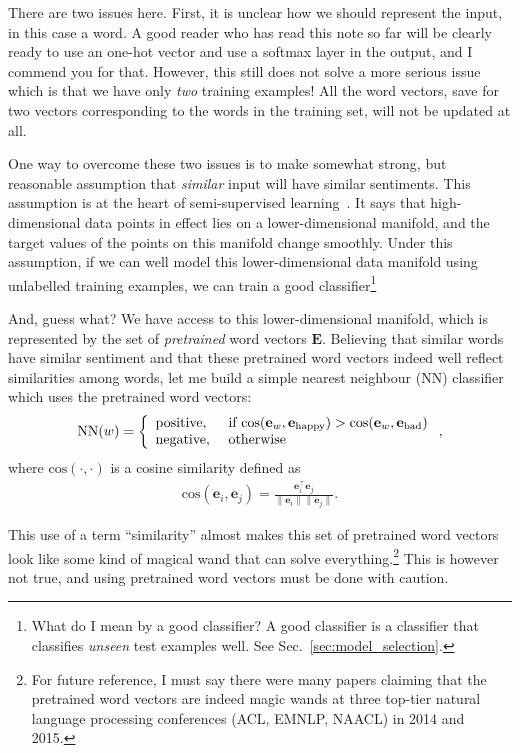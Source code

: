 \documentclass{report}
\newcommand{\vect}[1]{\mathbf{#1}}
\newcommand{\matr}[1]{\mathbf{#1}}
\newcommand{\ve}[0]{\vect{e}}
\newcommand{\mE}[0]{\matr{E}}
\begin{document}
There are two issues here. First, it is unclear how we should represent the
input, in this case a word. A good reader who has read this note so far will be
clearly ready to use an one-hot vector and use a softmax layer in the output,
and I commend you for that. However, this still does not solve a more serious
issue which is that we have only {\em two} training examples!  All the word
vectors, save for two vectors corresponding to the words in the training set,
will not be updated at all.

One way to overcome these two issues is to make somewhat strong, but reasonable
assumption that {\em similar} input will have similar sentiments. This
assumption is at the heart of semi-supervised learning~\cite{Chapelle2006}. It
says that high-dimensional data points in effect lies on a lower-dimensional
manifold, and the target values of the points on this manifold change smoothly.
Under this assumption, if we can well model this lower-dimensional data manifold
using unlabelled training examples, we can train a good classifier\footnote{
    What do I mean by a good classifier? A good classifier is a classifier that
    classifies {\em unseen} test examples well. See
    Sec.~\ref{sec:model_selection}.
} 

And, guess what? We have access to this lower-dimensional manifold, which is
represented by the set of {\em pretrained} word vectors $\mE$. Believing that
similar words have similar sentiment and that these pretrained word vectors
indeed well reflect similarities among words, let me build a simple nearest
neighbour (NN) classifier which uses the pretrained word vectors:
\begin{align*}
    \text{NN}(w) = \left\{ \begin{array}{l l}
            \text{positive},&\text{ if } \text{cos}(\ve_w,\ve_{\text{happy}}) > 
            \text{cos}(\ve_w,\ve_{\text{bad}}) \\
            \text{negative},&\text{ otherwise}
        \end{array}
    \right.,
\end{align*}
where $\text{cos}(\cdot, \cdot)$ is a cosine similarity defined as
\begin{align*}
    \text{cos}(\ve_i, \ve_j) = \frac{\ve_i^\top \ve_j}{\|\ve_i\| \|\ve_j\|}.
\end{align*}

This use of a term ``similarity'' almost makes this set of pretrained word
vectors look like some kind of magical wand that can solve everything.\footnote{
    For future reference, I must say there were many papers claiming that the
    pretrained word vectors are indeed magic wands at three top-tier natural
    language processing conferences (ACL, EMNLP, NAACL) in 2014 and 2015.
} This is however not true, and using pretrained word vectors must be done with
caution. 
\end{document}
